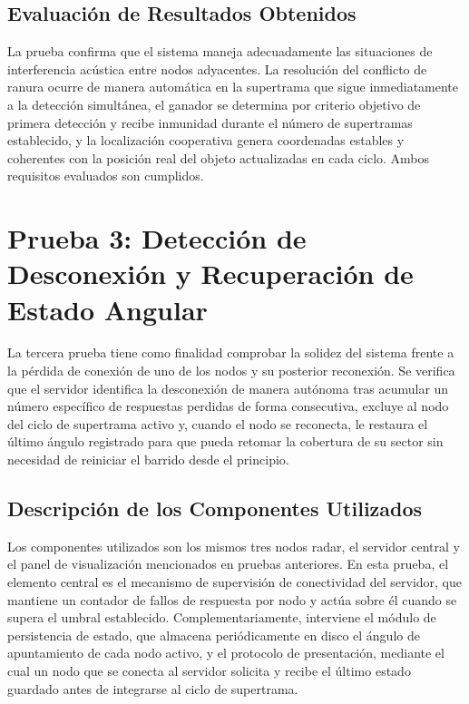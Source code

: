 \subsection{Evaluación de Resultados Obtenidos}

La prueba confirma que el sistema maneja adecuadamente las situaciones de interferencia acústica entre nodos adyacentes. La resolución del conflicto de ranura ocurre de manera automática en la supertrama que sigue inmediatamente a la detección simultánea, el ganador se determina por criterio objetivo de primera detección y recibe inmunidad durante el número de supertramas establecido, y la localización cooperativa genera coordenadas estables y coherentes con la posición real del objeto actualizadas en cada ciclo. Ambos requisitos evaluados son cumplidos.

\clearpage
\section{Prueba 3: Detección de Desconexión y Recuperación de Estado Angular}

La tercera prueba tiene como finalidad comprobar la solidez del sistema frente a la pérdida de conexión de uno de los nodos y su posterior reconexión. Se verifica que el servidor identifica la desconexión de manera autónoma tras acumular un número específico de respuestas perdidas de forma consecutiva, excluye al nodo del ciclo de supertrama activo y, cuando el nodo se reconecta, le restaura el último ángulo registrado para que pueda retomar la cobertura de su sector sin necesidad de reiniciar el barrido desde el principio.

\subsection{Descripción de los Componentes Utilizados}

Los componentes utilizados son los mismos tres nodos radar, el servidor central y el panel de visualización mencionados en pruebas anteriores. En esta prueba, el elemento central es el mecanismo de supervisión de conectividad del servidor, que mantiene un contador de fallos de respuesta por nodo y actúa sobre él cuando se supera el umbral establecido. Complementariamente, interviene el módulo de persistencia de estado, que almacena periódicamente en disco el ángulo de apuntamiento de cada nodo activo, y el protocolo de presentación, mediante el cual un nodo que se conecta al servidor solicita y recibe el último estado guardado antes de integrarse al ciclo de supertrama.

